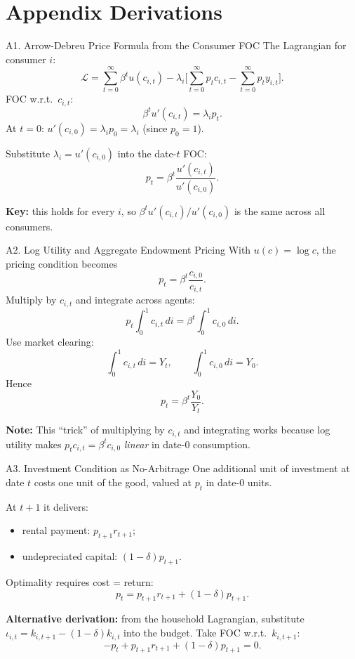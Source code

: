 \documentclass[aspectratio=169,10pt]{beamer}
\newcommand{\backbutton}[1]{\hfill\hyperlink{#1}{\beamerbutton{Back}}}
\begin{document}
\appendix
\section{Appendix Derivations}

\begin{frame}{A1. Arrow-Debreu Price Formula from the Consumer FOC}
\hypertarget{a1}{}
The Lagrangian for consumer $i$:
\[
\mathcal{L}=\sum_{t=0}^{\infty}\beta^t u(c_{i,t})-\lambda_i\Big[\sum_{t=0}^{\infty}p_t c_{i,t}-\sum_{t=0}^{\infty}p_t y_{i,t}\Big].
\]
FOC w.r.t.\ $c_{i,t}$:
\[
\beta^t u'(c_{i,t})=\lambda_i p_t.
\]
At $t=0$: $u'(c_{i,0})=\lambda_i p_0=\lambda_i$ (since $p_0=1$).

Substitute $\lambda_i=u'(c_{i,0})$ into the date-$t$ FOC:
\[
p_t=\beta^t \frac{u'(c_{i,t})}{u'(c_{i,0})}.
\]

\textbf{Key:} this holds for every $i$, so $\beta^t u'(c_{i,t})/u'(c_{i,0})$ is the same across all consumers.
\backbutton{m-a1}
\end{frame}

\begin{frame}{A2. Log Utility and Aggregate Endowment Pricing}
\hypertarget{a2}{}
With $u(c)=\log c$, the pricing condition becomes
\[
p_t=\beta^t\frac{c_{i,0}}{c_{i,t}}.
\]
Multiply by $c_{i,t}$ and integrate across agents:
\[
p_t\int_0^1 c_{i,t}\,di=\beta^t\int_0^1 c_{i,0}\,di.
\]
Use market clearing:
\[
\int_0^1 c_{i,t}\,di=Y_t,
\qquad
\int_0^1 c_{i,0}\,di=Y_0.
\]
Hence
\[
p_t=\beta^t\frac{Y_0}{Y_t}.
\]

\textbf{Note:} This ``trick'' of multiplying by $c_{i,t}$ and integrating works because log utility makes $p_t c_{i,t}=\beta^t c_{i,0}$ \emph{linear} in date-0 consumption.
\backbutton{m-a2}
\end{frame}

\begin{frame}{A3. Investment Condition as No-Arbitrage}
\hypertarget{a3}{}
One additional unit of investment at date $t$ costs one unit of the good, valued at $p_t$ in date-0 units.

\medskip
At $t+1$ it delivers:
\begin{itemize}
  \item rental payment: $p_{t+1}r_{t+1}$;
  \item undepreciated capital: $(1-\delta)p_{t+1}$.
\end{itemize}
Optimality requires cost = return:
\[
p_t=p_{t+1}r_{t+1}+(1-\delta)p_{t+1}.
\]

\medskip
\textbf{Alternative derivation:} from the household Lagrangian, substitute $\iota_{i,t}=k_{i,t+1}-(1-\delta)k_{i,t}$ into the budget. Take FOC w.r.t.\ $k_{i,t+1}$:
\[
-p_t + p_{t+1}r_{t+1} + (1-\delta)p_{t+1} = 0.
\]
\backbutton{m-a3}
\end{frame}
\end{document}
